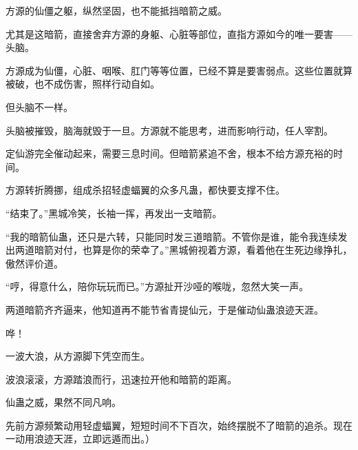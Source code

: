 \begin{this_body}
方源的仙僵之躯，纵然坚固，也不能抵挡暗箭之威。

尤其是这暗箭，直接舍弃方源的身躯、心脏等部位，直指方源如今的唯一要害——头脑。

方源成为仙僵，心脏、咽喉、肛门等等位置，已经不算是要害弱点。这些位置就算被破，也不成伤害，照样行动自如。

但头脑不一样。

头脑被摧毁，脑海就毁于一旦。方源就不能思考，进而影响行动，任人宰割。

定仙游完全催动起来，需要三息时间。但暗箭紧追不舍，根本不给方源充裕的时间。

方源转折腾挪，组成杀招轻虚蝠翼的众多凡蛊，都快要支撑不住。

“结束了。”黑城冷笑，长袖一挥，再发出一支暗箭。

“我的暗箭仙蛊，还只是六转，只能同时发三道暗箭。不管你是谁，能令我连续发出两道暗箭对付，也算是你的荣幸了。”黑城俯视着方源，看着他在生死边缘挣扎，傲然评价道。

“哼，得意什么，陪你玩玩而已。”方源扯开沙哑的喉咙，忽然大笑一声。

两道暗箭齐齐逼来，他知道再不能节省青提仙元，于是催动仙蛊浪迹天涯。

哗！

一波大浪，从方源脚下凭空而生。

波浪滚滚，方源踏浪而行，迅速拉开他和暗箭的距离。

仙蛊之威，果然不同凡响。

先前方源频繁动用轻虚蝠翼，短短时间不下百次，始终摆脱不了暗箭的追杀。现在一动用浪迹天涯，立即远遁而出。）

\end{this_body}


